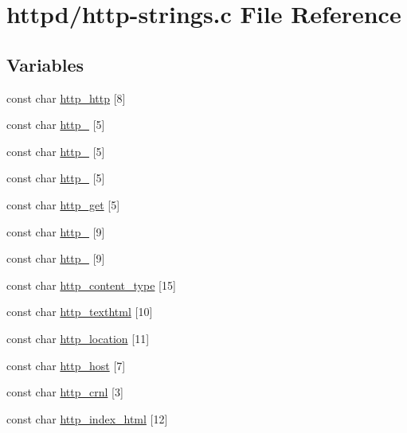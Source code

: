 \hypertarget{http-strings_8c}{
\section{httpd/http-\/strings.c File Reference}
\label{http-strings_8c}
}
\subsection*{Variables}
\begin{DoxyCompactItemize}
\item 
const char \hyperlink{http-strings_8c_acaaccd24059edb3f7a8182b1d6b83c78}{http\_\-http} \mbox{[}8\mbox{]}
\item 
const char \hyperlink{http-strings_8c_a051b06f37d5b16df80d17fb10e858c29}{http\_} \mbox{[}5\mbox{]}
\item 
const char \hyperlink{http-strings_8c_af9f47cee12d80f0e2b624264187fe87e}{http\_} \mbox{[}5\mbox{]}
\item 
const char \hyperlink{http-strings_8c_a274fe490acb83731df70a98d4954ad9d}{http\_} \mbox{[}5\mbox{]}
\item 
const char \hyperlink{http-strings_8c_aeab14be7c9393694bc1d1e858cd0f512}{http\_\-get} \mbox{[}5\mbox{]}
\item 
const char \hyperlink{http-strings_8c_a53c130cd156bfd5adeb5f7e4cc5967e4}{http\_} \mbox{[}9\mbox{]}
\item 
const char \hyperlink{http-strings_8c_a9bc6680c526e8354582bb9f71c50710f}{http\_} \mbox{[}9\mbox{]}
\item 
const char \hyperlink{http-strings_8c_a1efed1f3f714de7d7748f67613286228}{http\_\-content\_\-type} \mbox{[}15\mbox{]}
\item 
const char \hyperlink{http-strings_8c_a0b945415ffe9889bcc9f876fbf332134}{http\_\-texthtml} \mbox{[}10\mbox{]}
\item 
const char \hyperlink{http-strings_8c_ae44cdccc053a527b644269f796af7e62}{http\_\-location} \mbox{[}11\mbox{]}
\item 
const char \hyperlink{http-strings_8c_a61e4dca10281be3a140757f3d8fbf019}{http\_\-host} \mbox{[}7\mbox{]}
\item 
const char \hyperlink{http-strings_8c_af2e1f75e5b640c00f89dd6d9598d08a2}{http\_\-crnl} \mbox{[}3\mbox{]}
\item 
const char \hyperlink{http-strings_8c_ae3489af8c42b05e3c9f786e3f7be2d2f}{http\_\-index\_\-html} \mbox{[}12\mbox{]}
\item 

\end{DoxyCompactItemize}
